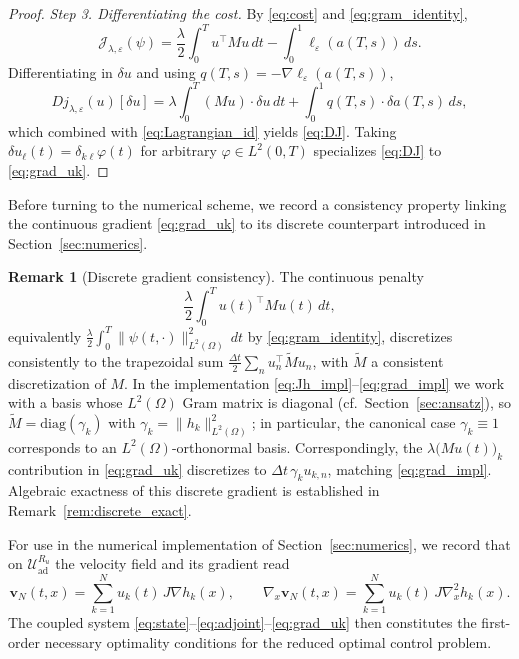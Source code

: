 \documentclass[12pt, reqno]{amsart}
\theoremstyle{plain}
\theoremstyle{definition}
\newtheorem{remark}[thm]{Remark}
\numberwithin{equation}{section}
\numberwithin{figure}{section}
\numberwithin{algorithm}{section}
\begin{document}
\begin{proof}
\vskip 5pt
\noindent\textit{Step 3. Differentiating the cost.}
By \eqref{eq:cost} and \eqref{eq:gram_identity}, $$\mathcal J_{\lambda,\varepsilon}(\psi)=\frac\lambda2\int_0^T u^\top Mu\,dt-\int_0^1\ell_\varepsilon(a(T,s))\,ds.$$ Differentiating in $\delta u$ and using $q(T,s)=-\nabla\ell_\varepsilon(a(T,s))$,
\[
Dj_{\lambda,\varepsilon}(u)[\delta u]
=\lambda\!\int_0^T\!\!(Mu)\cdot\delta u\,dt+\int_0^1 q(T,s)\cdot\delta a(T,s)\,ds,
\]
which combined with \eqref{eq:Lagrangian_id} yields \eqref{eq:DJ}. Taking $\delta u_\ell(t)=\delta_{k\ell}\varphi(t)$ for arbitrary $\varphi\in L^2(0,T)$ specializes \eqref{eq:DJ} to \eqref{eq:grad_uk}.
\end{proof}

Before turning to the numerical scheme, we record a consistency property linking the continuous gradient \eqref{eq:grad_uk} to its discrete counterpart introduced in Section~\ref{sec:numerics}.

\begin{remark}[Discrete gradient consistency]\label{rem:disc_cont_consistency}
The continuous penalty $$\frac\lambda 2\int_0^T u(t)^\top M u(t)\,dt,$$ equivalently $\frac\lambda 2\int_0^T\|\psi(t,\cdot)\|_{L^2(\Omega)}^2\,dt$ by \eqref{eq:gram_identity}, discretizes consistently to the trapezoidal sum $\frac{\Delta t}{2}\sum_n u_n^\top \widetilde M u_n$, with $\widetilde M$ a consistent discretization of $M$. In the implementation \eqref{eq:Jh_impl}--\eqref{eq:grad_impl} we work with a basis whose $L^2(\Omega)$ Gram matrix is diagonal (cf.\ Section~\ref{sec:ansatz}), so $\widetilde M=\mathrm{diag}(\gamma_k)$ with $\gamma_k=\|h_k\|_{L^2(\Omega)}^2$; in particular, the canonical case $\gamma_k\equiv 1$ corresponds to an $L^2(\Omega)$-orthonormal basis. Correspondingly, the $\lambda\bigl(Mu(t)\bigr)_k$ contribution in \eqref{eq:grad_uk} discretizes to $\Delta t\,\gamma_k u_{k,n}$, matching \eqref{eq:grad_impl}. Algebraic exactness of this discrete gradient is established in Remark~\ref{rem:discrete_exact}.
\end{remark}

For use in the numerical implementation of Section~\ref{sec:numerics}, we record that on $\mathcal U_{\mathrm{ad}}^{R_u}$ the velocity field and its gradient read
\[
\mathbf{v}_N(t,x)
=
\sum_{k=1}^N u_k(t)\,J\nabla h_k(x),
\qquad
\nabla_x\mathbf{v}_N(t,x)
=
\sum_{k=1}^N u_k(t)\,J\nabla_x^2 h_k(x).
\]
The coupled system \eqref{eq:state}--\eqref{eq:adjoint}--\eqref{eq:grad_uk} then constitutes the first-order necessary optimality conditions for the reduced optimal control problem.
\end{document}
